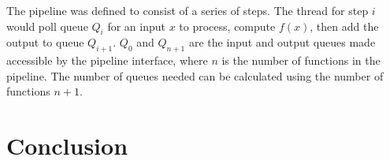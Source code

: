 \documentclass[12pt]{article}
\begin{document}
The pipeline was defined to consist of a series of steps. The thread for step $i$ would poll queue $Q_i$ for an input $x$ to process, compute $f(x)$, then add the output to queue $Q_{i+1}$. $Q_0$ and $Q_{n+1}$ are the input and output queues made accessible by the pipeline interface, where $n$ is the number of functions in the pipeline. The number of queues needed can be calculated using the number of functions $n+1$. 

\section*{Conclusion}

%
%
\end{document}
